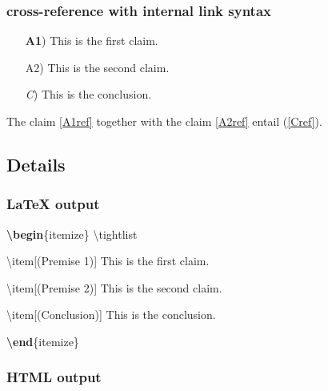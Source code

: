 \documentclass[
]{article}
\makeatletter
\newenvironment{Shaded}{}{}
\newcommand{\ExtensionTok}[1]{#1}
\newcommand{\FunctionTok}[1]{\textcolor[rgb]{0.02,0.16,0.49}{#1}}
\newcommand{\KeywordTok}[1]{\textcolor[rgb]{0.00,0.44,0.13}{\textbf{#1}}}
\newcommand{\NormalTok}[1]{#1}
\providecommand{\tightlist}{%
  \setlength{\itemsep}{0pt}\setlength{\parskip}{0pt}}
\def\labelledlistlabel#1#2{\begingroup
    \def\@currentlabel{#2}%
    \label{#1}\endgroup
    }
\makeatother
\begin{document}
\hypertarget{cross-reference-with-internal-link-syntax}{%
\subsubsection{cross-reference with internal link
syntax}\label{cross-reference-with-internal-link-syntax}}

\begin{itemize}
\tightlist

\item[\textbf{A1})\labelledlistlabel{A1ref}{\textbf{A1}}] This is the
first claim.

\item[A2)\labelledlistlabel{A2ref}{A2}] This is the second claim.

\item[\emph{C})\labelledlistlabel{Cref}{\emph{C}}] This is the
conclusion.

\end{itemize}

The claim \ref{A1ref} together with the claim \ref{A2ref} entail
(\ref{Cref}).

\hypertarget{details}{%
\subsection{Details}\label{details}}

\hypertarget{latex-output}{%
\subsubsection{LaTeX output}\label{latex-output}}

\begin{Shaded}
\begin{Highlighting}[]
\KeywordTok{\textbackslash{}begin}\NormalTok{\{}\ExtensionTok{itemize}\NormalTok{\}}
\FunctionTok{\textbackslash{}tightlist}

\FunctionTok{\textbackslash{}item}\NormalTok{[(Premise 1)] This is the first claim.}

\FunctionTok{\textbackslash{}item}\NormalTok{[(Premise 2)] This is the second claim.}

\FunctionTok{\textbackslash{}item}\NormalTok{[(Conclusion)] This is the conclusion.}

\KeywordTok{\textbackslash{}end}\NormalTok{\{}\ExtensionTok{itemize}\NormalTok{\}}
\end{Highlighting}
\end{Shaded}

\hypertarget{html-output}{%
\subsubsection{HTML output}\label{html-output}}
\end{document}
